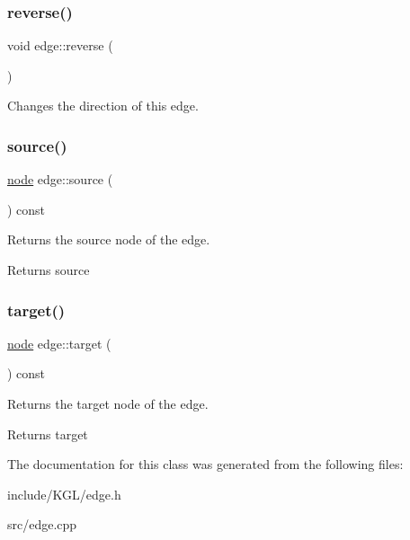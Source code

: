 \subsubsection{\texorpdfstring{reverse()}{reverse()}}
{\footnotesize\ttfamily void edge\+::reverse (\begin{DoxyParamCaption}{ }\end{DoxyParamCaption})}

Changes the direction of this edge. \mbox{\label{classedge_ae82d5701f7e6f71edc3c8b0e34bcd2b7}} 
\subsubsection{\texorpdfstring{source()}{source()}}
{\footnotesize\ttfamily \mbox{\hyperlink{classnode}{node}} edge\+::source (\begin{DoxyParamCaption}{ }\end{DoxyParamCaption}) const}

Returns the source node of the edge.

\begin{DoxyReturn}{Returns}
source 
\end{DoxyReturn}
\mbox{\label{classedge_a97563b611261478ee19c6ce055f1a3ee}} 
\subsubsection{\texorpdfstring{target()}{target()}}
{\footnotesize\ttfamily \mbox{\hyperlink{classnode}{node}} edge\+::target (\begin{DoxyParamCaption}{ }\end{DoxyParamCaption}) const}

Returns the target node of the edge.

\begin{DoxyReturn}{Returns}
target 
\end{DoxyReturn}


The documentation for this class was generated from the following files\+:\begin{DoxyCompactItemize}
\item 
include/\+K\+G\+L/edge.\+h\item 
src/edge.\+cpp\end{DoxyCompactItemize}
